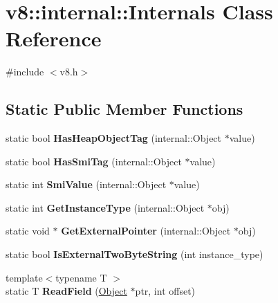 \hypertarget{classv8_1_1internal_1_1_internals}{}\section{v8\+:\+:internal\+:\+:Internals Class Reference}
\label{classv8_1_1internal_1_1_internals}


{\ttfamily \#include $<$v8.\+h$>$}

\subsection*{Static Public Member Functions}
\begin{DoxyCompactItemize}
\item 
\hypertarget{classv8_1_1internal_1_1_internals_a2d3dc335df00b84e7e242e40012238ae}{}static bool {\bfseries Has\+Heap\+Object\+Tag} (internal\+::\+Object $\ast$value)\label{classv8_1_1internal_1_1_internals_a2d3dc335df00b84e7e242e40012238ae}

\item 
\hypertarget{classv8_1_1internal_1_1_internals_a6163342aeb37f207d618d9fb5d646a04}{}static bool {\bfseries Has\+Smi\+Tag} (internal\+::\+Object $\ast$value)\label{classv8_1_1internal_1_1_internals_a6163342aeb37f207d618d9fb5d646a04}

\item 
\hypertarget{classv8_1_1internal_1_1_internals_a9a26879dad8b7fdd38ebbeaad162b96c}{}static int {\bfseries Smi\+Value} (internal\+::\+Object $\ast$value)\label{classv8_1_1internal_1_1_internals_a9a26879dad8b7fdd38ebbeaad162b96c}

\item 
\hypertarget{classv8_1_1internal_1_1_internals_aec6dbaf56b230e37eef5ed1ed0e56a9b}{}static int {\bfseries Get\+Instance\+Type} (internal\+::\+Object $\ast$obj)\label{classv8_1_1internal_1_1_internals_aec6dbaf56b230e37eef5ed1ed0e56a9b}

\item 
\hypertarget{classv8_1_1internal_1_1_internals_a77c94e6b4e68d6c73dec78d81a0c219a}{}static void $\ast$ {\bfseries Get\+External\+Pointer} (internal\+::\+Object $\ast$obj)\label{classv8_1_1internal_1_1_internals_a77c94e6b4e68d6c73dec78d81a0c219a}

\item 
\hypertarget{classv8_1_1internal_1_1_internals_a072f010fdf69ea2c0d7145190221410f}{}static bool {\bfseries Is\+External\+Two\+Byte\+String} (int instance\+\_\+type)\label{classv8_1_1internal_1_1_internals_a072f010fdf69ea2c0d7145190221410f}

\item 
\hypertarget{classv8_1_1internal_1_1_internals_a457c0c73d5fdf4cc577133edce0ce37b}{}{\footnotesize template$<$typename T $>$ }\\static T {\bfseries Read\+Field} (\hyperlink{classv8_1_1_object}{Object} $\ast$ptr, int offset)\label{classv8_1_1internal_1_1_internals_a457c0c73d5fdf4cc577133edce0ce37b}

\end{DoxyCompactItemize}
